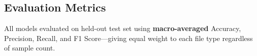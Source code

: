 \documentclass[12pt,a4paper]{report}
\begin{document}
\begin{normalsize}
\section{Evaluation Metrics}
{\setlength{\baselineskip}{0.95\baselineskip}
All models evaluated on held-out test set using \textbf{macro-averaged} Accuracy, Precision, Recall, and F1 Score---giving equal weight to each file type regardless of sample count.
\par}

\end{normalsize}

\newpage
\chapter{}
\end{document}
